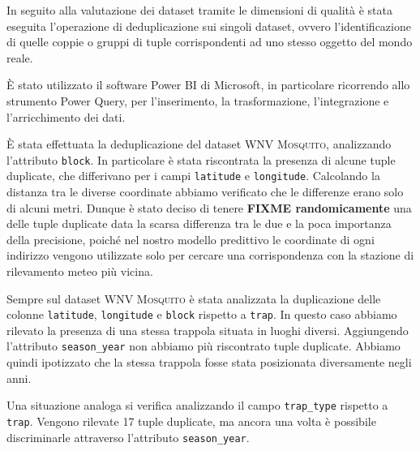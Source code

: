 In seguito alla valutazione dei dataset tramite le dimensioni di qualità è 
stata eseguita l'operazione di deduplicazione sui singoli dataset, ovvero 
l'identificazione di quelle coppie o gruppi di tuple corrispondenti ad uno 
stesso oggetto del mondo reale.

È stato utilizzato il software Power BI di Microsoft, 
in particolare ricorrendo allo strumento Power Query, per l'inserimento, la 
trasformazione, l'integrazione e l'arricchimento dei dati.

È stata effettuata la deduplicazione del dataset \textsc{WNV Mosquito}, 
analizzando l'attributo \texttt{block}. In particolare è stata riscontrata 
la presenza di alcune tuple duplicate, che differivano per i campi 
\texttt{latitude} e \texttt{longitude}. Calcolando la distanza tra le diverse 
coordinate abbiamo verificato che le differenze erano solo di alcuni metri.
Dunque è stato deciso di tenere \textbf{FIXME randomicamente} una delle tuple 
duplicate data la scarsa differenza tra le due e la poca importanza della 
precisione, poiché nel nostro modello predittivo le coordinate di ogni 
indirizzo vengono utilizzate solo per cercare una corrispondenza con la 
stazione di rilevamento meteo più vicina.

Sempre sul dataset \textsc{WNV Mosquito} è stata analizzata la duplicazione 
delle colonne \texttt{latitude}, \texttt{longitude} e \texttt{block} rispetto a 
\texttt{trap}. In questo caso abbiamo rilevato la presenza di una stessa 
trappola situata in luoghi diversi. Aggiungendo l'attributo 
\texttt{season\_year} non abbiamo più riscontrato tuple duplicate. Abbiamo 
quindi ipotizzato che la stessa trappola fosse stata posizionata diversamente 
negli anni.

Una situazione analoga si verifica analizzando il campo \texttt{trap\_type} 
rispetto a \texttt{trap}. Vengono rilevate 17 tuple duplicate, ma ancora una 
volta è possibile discriminarle attraverso l'attributo \texttt{season\_year}.
